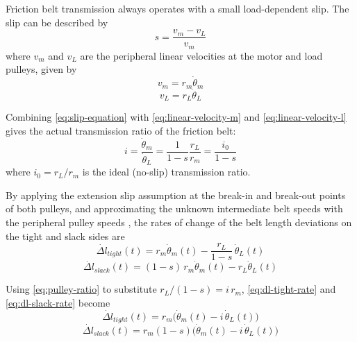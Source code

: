 Friction belt transmission always operates with a small load-dependent slip. The slip can be described by
\begin{equation}
	s = \frac{v_{m} - v_{L}}{v_m}
	\label{eq:slip-equation}
\end{equation}
where $v_m$ and $v_L$ are the peripheral linear velocities at the motor and load pulleys, given by
\begin{equation}
	v_m = r_m \dot{\theta}_m
	\label{eq:linear-velocity-m}
\end{equation}
\begin{equation}
	v_L = r_L \dot{\theta}_L
	\label{eq:linear-velocity-l}
\end{equation}

Combining \autoref{eq:slip-equation} with \autoref{eq:linear-velocity-m} and \autoref{eq:linear-velocity-l}
gives the actual transmission ratio of the friction belt:
\begin{equation}
	i = \frac{\dot{\theta}_m}{\dot{\theta}_L} = \frac{1}{1-s}\frac{r_L}{r_m} = \frac{i_0}{1-s}
	\label{eq:pulley-ratio}
\end{equation}
where $i_0 = r_L / r_m$ is the ideal (no-slip) transmission ratio.

By applying the extension slip assumption at the break-in and break-out points of both pulleys, and approximating the unknown intermediate belt speeds with the peripheral pulley speeds \cite{isermann2005mechatronic}, the rates of change of the belt length deviations on the tight and slack sides are
\begin{equation}
	\dot{\Delta l}_{tight}(t) = r_m\dot{\theta}_m(t) - \frac{r_L}{1-s}\,\dot{\theta}_L(t)
	\label{eq:dl-tight-rate}
\end{equation}
\begin{equation}
	\dot{\Delta l}_{slack}(t) = (1-s)\,r_m\dot{\theta}_m(t) - r_L\dot{\theta}_L(t)
	\label{eq:dl-slack-rate}
\end{equation}

Using \autoref{eq:pulley-ratio} to substitute $r_L/(1-s) = i\,r_m$, \autoref{eq:dl-tight-rate} and \autoref{eq:dl-slack-rate} become
\begin{equation}
	\dot{\Delta l}_{tight}(t) = r_m\bigl(\dot{\theta}_m(t) - i\,\dot{\theta}_L(t)\bigr)
\end{equation}
\begin{equation}
	\dot{\Delta l}_{slack}(t) = r_m(1-s)\bigl(\dot{\theta}_m(t) - i\,\dot{\theta}_L(t)\bigr)
\end{equation}

